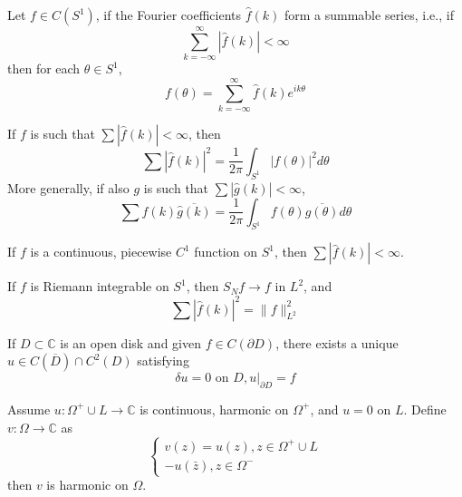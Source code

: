 \documentclass[openany]{book}
\newcommand{\C}{\mathbb{C}}
\begin{document}
\begin{prop}
    Let $f\in C(S^1)$, if the Fourier coefficients $\hat{f}(k)$ form a summable series, i.e., if 
    \begin{equation*}
        \sum_{k=-\infty}^\infty|\hat{f}(k)|<\infty
    \end{equation*}
    then for each $\theta\in S^1$, 
    \begin{equation*}
        f(\theta)=\sum_{k=-\infty}^\infty\hat{f}(k)e^{ik\theta}
    \end{equation*}
\end{prop}



\begin{prop}
    If $f$ is such that $\sum|\hat{f}(k)|<\infty$, then 
    \begin{equation*}
        \sum|\hat{f}(k)|^2=\frac{1}{2\pi}\int_{S^1}|f(\theta)|^2d\theta
    \end{equation*}
    More generally, if also $g$ is such that $\sum|\hat{g}(k)|<\infty$, 
    \begin{equation*}
        \sum\hat{f}(k)\overline{\hat{g}(k)}=\frac{1}{2\pi}\int_{S^1}f(\theta)\overline{g(\theta)}d\theta
    \end{equation*}
\end{prop}

\begin{prop}
    If $f$ is a continuous, piecewise $C^1$ function on $S^1$, then $\sum|\hat{f}(k)|<\infty$.
\end{prop}

\begin{prop}
    If $f$ is Riemann integrable on $S^1$, then $S_Nf\to f$ in $L^2$, and 
    \begin{equation*}
        \sum|\hat{f}(k)|^2=\|f\|_{L^2}^2
    \end{equation*}
\end{prop}

\begin{prop}
    If $D\subset\C$ is an open disk and given $f\in C(\partial D)$, there exists a unique $u\in C(\overline{D})\cap C^2(D)$ satisfying 
    \begin{equation*}
        \delta u=0 \text{ on } D, u\vert_{\partial D}=f
    \end{equation*}
\end{prop}


\begin{prop}
    Assume $u:\Omega^+\cup L\to\C$ is continuous, harmonic on $\Omega^+$, and $u=0$ on $L$. Define $v:\Omega\to\C$ as 
    \begin{equation*}
        \begin{cases}
            v(z)=u(z), z\in \Omega^+\cup L\\
            -u(\bar{z}), z\in\Omega^-
        \end{cases}
    \end{equation*}
    then $v$ is harmonic on $\Omega$.
\end{prop}
\end{document}
